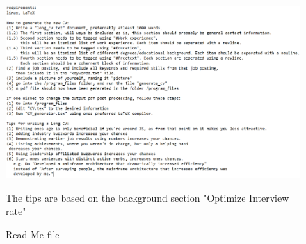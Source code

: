 \begin{figure}[H]
      \centering
      \includegraphics[scale = 0.7]{figures/readme.png}
      \caption{Read Me file}
      The tips are based on the background section "Optimize Interview rate"
\end{figure}